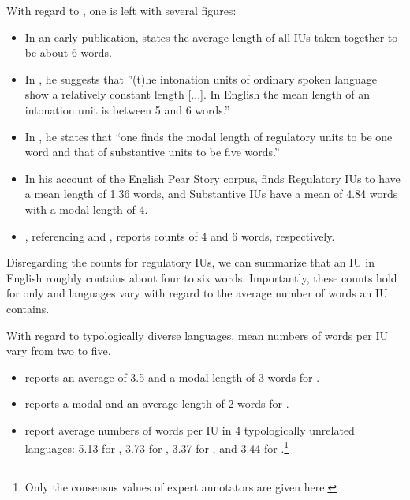 With regard to , one is left with several figures:

\begin{itemize}
	\item In an early publication, \citet[14]{chafe1980pear} states the average length of all IUs taken together to be about 6 words.
	\item In \citet[42]{CHAFE_1988}, he suggests that ”(t)he intonation units of ordinary spoken language show a relatively constant length [...]. In English the mean length of an intonation unit is between 5 and 6 words.”
	\item In \citet[39]{chafe1993prosodic}, he states that “one finds the modal length of regulatory units to be one word and that of substantive units to be five words.”
	\item In his account of the English Pear Story corpus,  \citet[64]{chafe1994discourse} finds Regulatory IUs to have a mean length of 1.36 words, and Substantive IUs have a mean of 4.84 words with a modal length of 4.
	\item \citet{Croft_1995}, referencing \citet[282]{altenberg1987prosodic} and \citet[256]{crystal1969prosodic}, reports counts of 4 and 6 words, respectively.
\end{itemize}


Disregarding the counts for regulatory IUs, we can summarize that an IU in English roughly contains about four to six words.  Importantly, these counts hold for  only and languages vary with regard to the average number of words an IU contains.  



With regard to typologically diverse languages, mean numbers of words per IU vary from two to five. 

\begin{itemize}
	\item \citet[52--54]{Tao_1996} reports an average of 3.5  and a modal length of 3 words for .
	\item \citet[148]{chafe1994discourse} reports a modal and an average length of 2 words for .
	\item \citet[224]{himmelmann_IP_Universal} report average numbers of words per IU in 4 typologically unrelated languages: 5.13 for , 3.73 for , 3.37 for , and 3.44 for .\footnote{Only the consensus values of  expert annotators are given here.}
\end{itemize}



